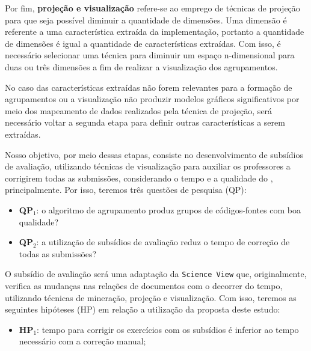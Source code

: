 	 	Por fim, \textbf{projeção e visualização} refere-se ao emprego de técnicas de
	 	projeção para que seja possível diminuir a quantidade de dimensões. Uma dimensão
	 	é referente a uma característica extraída da implementação, portanto a quantidade
	 	de dimensões é igual a quantidade de características extraídas. Com isso, é
	 	necessário selecionar uma técnica para diminuir um espaço n-dimensional para
	 	duas ou três dimensões a fim de realizar a visualização dos agrupamentos.
	 	
	 	No caso das características extraídas não forem relevantes para a formação de
	 	agrupamentos ou a visualização não produzir modelos gráficos significativos por
	 	meio dos mapeamento de dados realizados pela técnica de projeção, será necessário
	 	voltar a segunda etapa para definir outras características a serem extraídas.
	 	
	 	Nosso objetivo, por meio dessas etapas, consiste no desenvolvimento de subsídios
	 	de avaliação, utilizando técnicas de visualização para auxiliar os professores a
	 	corrigirem todas as submissões, considerando o tempo e a qualidade do ,
	 	principalmente. Por isso, teremos três questões de pesquisa (QP):
	 	
	 	\begin{itemize}
	 		\item \textbf{QP$_1$}: o algoritmo de agrupamento produz grupos de códigos-fontes
	 		com boa qualidade?
	 		\item \textbf{QP$_2$}: a utilização de subsídios de avaliação reduz o tempo %
	 		de correção de todas as submissões?
	 	\end{itemize}
	 	
	 	O subsídio de avaliação será uma adaptação da \texttt{Science View} \cite{Alencar-etal:2012}
	 	que, originalmente, verifica as mudanças nas relações de documentos com o decorrer do tempo,
	 	utilizando técnicas de mineração, projeção e visualização. Com isso, teremos as
	 	seguintes hipóteses (HP) em relação a utilização da proposta deste estudo:
	 	
	 	\begin{itemize}
	 		\item \textbf{HP$_1$}: tempo para corrigir os exercícios com os subsídios é inferior  %
	 		ao tempo necessário com a correção manual;
	 	\end{itemize}
	 	

